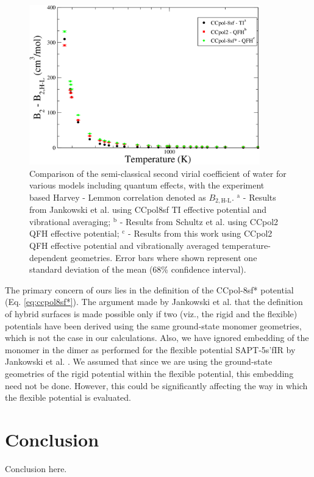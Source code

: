         \begin{figure}[!htbp]
            \centering
            \includegraphics[width=10cm,keepaspectratio]{Chapter-7/Figures/B2SCAll.png}
            \caption{Comparison of the semi-classical second virial coefficient of water for various models including quantum effects, with the experiment based Harvey - Lemmon correlation \cite{Harvey2004} denoted as $B_{2,\text{H-L}}$. $^\text{a}$ - Results from Jankowski et al. \cite{Jankowski2015} using CCpol8sf TI effective potential and vibrational averaging; $^\text{b}$ - Results from Schultz et al. \cite{Schultz2015} using CCpol2 QFH effective potential; $^\text{c}$ - Results from this work using CCpol2 QFH effective potential and vibrationally averaged temperature-dependent geometries. Error bars where shown represent one standard deviation of the mean (68\% confidence interval).}
            \label{fig:B2SC-comparison}
        \end{figure}

        The primary concern of ours lies in the definition of the CCpol-8sf* potential (Eq. \eqref{eq:ccpol8sf*}). The argument made by Jankowski et al. \cite{Jankowski2015} that the definition of hybrid surfaces is made possible only if two (viz., the rigid and the flexible) potentials have been derived using the same ground-state monomer geometries, which is not the case in our calculations. Also, we have ignored embedding of the monomer in the dimer as performed for the flexible potential SAPT-5s'fIR by Jankowski et al. \cite{Jankowski2015}. We assumed that since we are using the ground-state geometries of the rigid potential within the flexible potential, this embedding need not be done. However, this could be significantly affecting the way in which the flexible potential is evaluated.

    \section{Conclusion}
    \label{chap7-sec:conclusion}
        Conclusion here.
